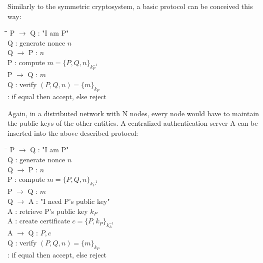 Similarly to the symmetric cryptosystem, a basic protocol can be conceived this way:

\begin{tabbing}
	\hspace{4em}\=\hspace{4em}\=\hspace{2em}\=\kill
	\>  P $\rightarrow$ Q\>  : \> "I am P" \\
	\>  Q  \>  : \> generate nonce $n$	\\
	\>  Q $\rightarrow$ P \>  : \> $n$ \\
	\>  P  \>  : \> compute $m = \lbrace P, Q, n \rbrace_{k_{P}^{-1}}$ 				\\
	\>  P $\rightarrow$ Q \>  : \> $m$ \\
	\>  Q \>  : \> verify $(P,Q,n) = \lbrace m \rbrace_{k_{P}}$ \\
	\>    \>  : \> if equal then accept, else reject \\
\end{tabbing} 

Again, in a distributed network with N nodes, every node would have to maintain the public keys of the other entities. A centralized authentication server A can be inserted into the above described protocol:

\begin{tabbing}
	\hspace{4em}\=\hspace{4em}\=\hspace{2em}\=\kill
	\>  P $\rightarrow$ Q\>  : \> "I am P" \\
	\>  Q  \>  : \> generate nonce $n$	\\
	\>  Q $\rightarrow$ P \>  : \> $n$ \\
	\>  P  \>  : \> compute $m = \lbrace P, Q, n \rbrace_{k_{P}^{-1}}$ 				\\
	\>  P $\rightarrow$ Q \>  : \> $m$ \\
	\>  Q $\rightarrow$ A \>  : \> "I need P's public key" \\
	\>  A \>  : \> retrieve P's public key $k_{P}$ \\
	\>  A \>  : \> create certificate $c = \lbrace P, k_{P} \rbrace_{k_{A}^{-1}} $ \\
	\>  A $\rightarrow$ Q \>  : \> $P,c$ \\
	\>  Q \>  : \> verify $(P,Q,n) = \lbrace m \rbrace_{k_{P}}$ \\
	\>    \>  : \> if equal then accept, else reject \\
\end{tabbing} 

